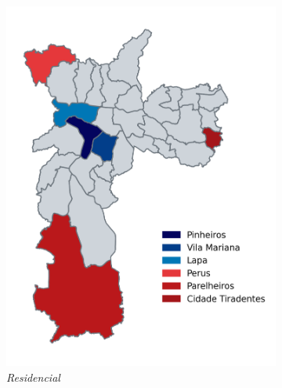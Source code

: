 \documentclass[12pt,a4paper]{article}
\theoremstyle{break}
\begin{document}
\begin{figure}[htbp]
\begin{subfigure}[b]{0.32\textwidth}
    \includegraphics[width=\textwidth]{q1_b.png}
    \caption*{\emph{Residencial}}
  \end{subfigure}
  \hfill %
  \begin{subfigure}[b]{0.32\textwidth}

\end{subfigure}
\end{figure}
\end{document}
